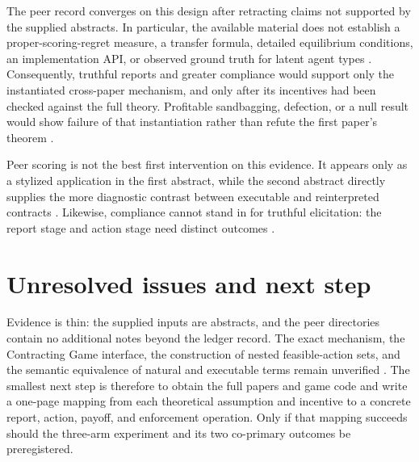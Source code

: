 \documentclass{article}
\begin{document}
The peer record converges on this design after retracting claims not supported
by the supplied abstracts.  In particular, the available material does not
establish a proper-scoring-regret measure, a transfer formula, detailed
equilibrium conditions, an implementation API, or observed ground truth for
latent agent types .  Consequently, truthful reports and greater
compliance would support only the instantiated cross-paper mechanism, and only
after its incentives had been checked against the full theory.  Profitable
sandbagging, defection, or a null result would show failure of that
instantiation rather than refute the first paper's theorem
.

Peer scoring is not the best first intervention on this evidence.  It appears
only as a stylized application in the first abstract, while the second abstract
directly supplies the more diagnostic contrast between executable and
reinterpreted contracts .  Likewise, compliance cannot stand in
for truthful elicitation: the report stage and action stage need distinct
outcomes .

\section{Unresolved issues and next step}

Evidence is thin: the supplied inputs are abstracts, and the peer directories
contain no additional notes beyond the ledger record.  The exact mechanism,
the Contracting Game interface, the construction of nested feasible-action
sets, and the semantic equivalence of natural and executable terms remain
unverified .  The smallest next step is therefore to obtain the
full papers and game code and write a one-page mapping from each theoretical
assumption and incentive to a concrete report, action, payoff, and enforcement
operation.  Only if that mapping succeeds should the three-arm experiment and
its two co-primary outcomes be preregistered.
\end{document}

